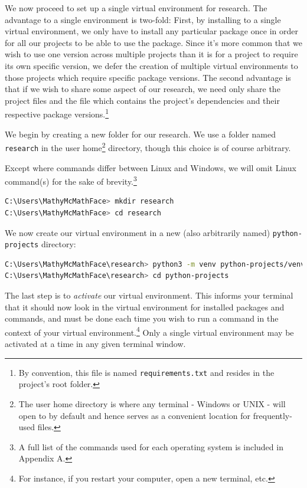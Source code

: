 \documentclass[12pt]{article}
\begin{document}
We now proceed to set up a single virtual environment for research. The advantage to a single environment is two-fold:
First, by installing to a single virtual environment, we only have to install any particular package once in order for 
all our projects to be able to use the package. Since it's more common that we wish to use one version across multiple
projects than it is for a project to require its own specific version, we defer the creation of multiple virtual 
environments to those projects which require specific package versions. The second advantage is that if we wish to share
some aspect of our research, we need only share the project files and the file which contains the project's dependencies
and their respective package versions.\footnote{
    By convention, this file is named \texttt{requirements.txt} and resides in the
    project's root folder.
}

We begin by creating a new folder for our research. We use a folder named \texttt{research} in the user
home\footnote{
    The user home directory is where any terminal - Windows or UNIX - will open to by default and hence serves as a
    convenient location for frequently-used files.
} directory, though this choice is of course arbitrary.

\pagebreak
Except where commands differ between Linux and Windows, we will
omit Linux command(s) for the sake of brevity.\footnote{
    A full list of the commands used for each operating system is included in Appendix A.
}


\begin{lstlisting}[language=bash, caption=Create Research Directory (Windows)]
C:\Users\MathyMcMathFace> mkdir research
C:\Users\MathyMcMathFace> cd research
\end{lstlisting}

We now create our virtual environment in a new (also arbitrarily named) \texttt{python-projects} directory:

\begin{lstlisting}[language=bash, caption=Create Virtual Environment (Windows)]
C:\Users\MathyMcMathFace\research> python3 -m venv python-projects/venv
C:\Users\MathyMcMathFace\research> cd python-projects
\end{lstlisting}

The last step is to \emph{activate} our virtual environment. This informs your terminal that it should now look in the
virtual environment for installed packages and commands, and must be done each time you wish to run a command in the
context of your virtual environment.\footnote{
    For instance, if you restart your computer, open a new terminal, etc.
} Only a single virtual environment may be activated at a time
in any given terminal window.
\end{document}
